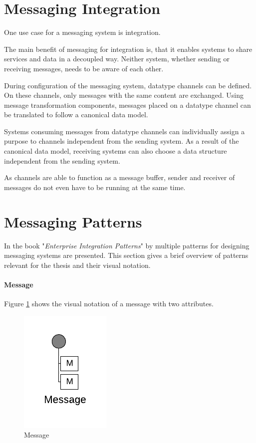 \section{Messaging Integration}

One use case for a messaging system is integration.

The main benefit of messaging for integration is, that it enables systems to share services and data in a decoupled way. Neither system, whether sending or receiving messages, needs to be aware of each other. 

During configuration of the messaging system, datatype channels can be defined. On these channels, only messages with the same content are exchanged. Using message transformation components, messages placed on a datatype channel can be translated to follow a canonical data model.

Systems consuming messages from datatype channels can individually assign a purpose to channels independent from the sending system. As a result of the canonical data model, receiving systems can also choose a data structure independent from the sending system.

As channels are able to function as a message buffer, sender and receiver of messages do not even have to be running at the same time.

\section{Messaging Patterns}

In the book "\textit{Enterprise Integration Patterns}" by \cite{EIP} multiple patterns for designing messaging systems are presented. This section gives a brief overview of patterns relevant for the thesis and their visual notation.

\paragraph{Message}

Figure \ref{messaging:message} shows the visual notation of a message with two attributes. 

\begin{figure}[H]
    \centering
    \includegraphics[scale=0.6]{Diagrams/Messaging/1. Message.pdf}
    \caption{Message}
    \label{messaging:message}
\end{figure}

